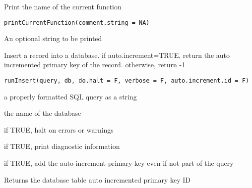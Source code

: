 \documentclass[letterpaper]{book}
\begin{document}
%
\begin{Description}\relax
Print the name of the current function
\end{Description}
%
\begin{Usage}
\begin{verbatim}
printCurrentFunction(comment.string = NA)
\end{verbatim}
\end{Usage}
%
\begin{Arguments}
\begin{ldescription}
\item[\code{comment.string}] An optional string to be printed
\end{ldescription}
\end{Arguments}
%
\begin{Description}\relax
Insert a record into a database. if auto.increment=TRUE, return the auto incremented
primary key of the record. otherwise, return -1
\end{Description}
%
\begin{Usage}
\begin{verbatim}
runInsert(query, db, do.halt = F, verbose = F, auto.increment.id = F)
\end{verbatim}
\end{Usage}
%
\begin{Arguments}
\begin{ldescription}
\item[\code{query}] a properly formatted SQL query as a string

\item[\code{db}] the name of the database

\item[\code{do.halt}] if TRUE, halt on errors or warnings

\item[\code{verbose}] if TRUE, print diagnostic information

\item[\code{auto.increment}] if TRUE, add the auto increment primary key even if not part of the query
\end{ldescription}
\end{Arguments}
%
\begin{Value}
Returns the database table auto incremented primary key ID
\end{Value}
\end{document}
